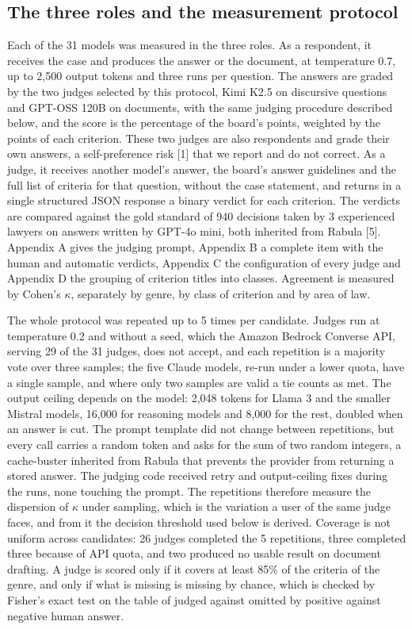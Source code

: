 \documentclass{IOS-Book-Article}
\begin{document}
\subsection{The three roles and the measurement protocol}

Each of the 31 models was measured in the three roles. As a respondent, it receives the case and produces the answer or the document, at temperature 0.7, up to 2,500 output tokens and three runs per question. The answers are graded by the two judges selected by this protocol, Kimi K2.5 on discursive questions and GPT-OSS 120B on documents, with the same judging procedure described below, and the score is the percentage of the board's points, weighted by the points of each criterion. These two judges are also respondents and grade their own answers, a self-preference risk [1] that we report and do not correct. As a judge, it receives another model's answer, the board's answer guidelines and the full list of criteria for that question, without the case statement, and returns in a single structured JSON response a binary verdict for each criterion. The verdicts are compared against the gold standard of 940 decisions taken by 3 experienced lawyers on answers written by GPT-4o mini, both inherited from Rabula [5]. Appendix A gives the judging prompt, Appendix B a complete item with the human and automatic verdicts, Appendix C the configuration of every judge and Appendix D the grouping of criterion titles into classes. Agreement is measured by Cohen's $\kappa$, separately by genre, by class of criterion and by area of law.

The whole protocol was repeated up to 5 times per candidate. Judges run at temperature 0.2 and without a seed, which the Amazon Bedrock Converse API, serving 29 of the 31 judges, does not accept, and each repetition is a majority vote over three samples; the five Claude models, re-run under a lower quota, have a single sample, and where only two samples are valid a tie counts as met. The output ceiling depends on the model: 2,048 tokens for Llama 3 and the smaller Mistral models, 16,000 for reasoning models and 8,000 for the rest, doubled when an answer is cut. The prompt template did not change between repetitions, but every call carries a random token and asks for the sum of two random integers, a cache-buster inherited from Rabula that prevents the provider from returning a stored answer. The judging code received retry and output-ceiling fixes during the runs, none touching the prompt. The repetitions therefore measure the dispersion of $\kappa$ under sampling, which is the variation a user of the same judge faces, and from it the decision threshold used below is derived. Coverage is not uniform across candidates: 26 judges completed the 5 repetitions, three completed three because of API quota, and two produced no usable result on document drafting. A judge is scored only if it covers at least 85\% of the criteria of the genre, and only if what is missing is missing by chance, which is checked by Fisher's exact test on the table of judged against omitted by positive against negative human answer.
\end{document}
